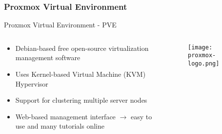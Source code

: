 \section{Proxmox Virtual Environment}

\begin{frame}{Proxmox Virtual Environment - PVE}
    \begin{columns}
        \begin{column}{0.6\linewidth}
            \begin{itemize}
                \item Debian-based free open-source virtualization management software
                \item Uses Kernel-based Virtual Machine (KVM) Hypervisor
                \item Support for clustering multiple server nodes
                \item Web-based management interface $\rightarrow$ easy to use and many tutorials online
            \end{itemize}
        \end{column}
        \begin{column}{0.4\linewidth}
            \begin{figure}
                \centering
                \texttt{[image: proxmox-logo.png]}\\
                \cite{proxmox-logo}
            \end{figure}
        \end{column}
    \end{columns}
\end{frame}

\part{}
\printbibliography[title = {Sources}, heading=none]
